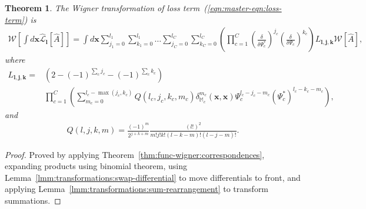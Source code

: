 \documentclass[12pt,aip,jmp,amssymb,amsmath]{revtex4-1}
\newtheorem{theorem}{Theorem}
\begin{document}
\begin{theorem}
\label{thm:transformations:w-losses}
    The Wigner transformation of loss term~(\ref{eqn:master-eqn:loss-term}) is
    \begin{equation*}\begin{split}
        \mathcal{W} \left[ \int d\boldsymbol{x} \hat{\mathcal{L}}_{\boldsymbol{l}} [\hat{A}] \right]
        = \int d\boldsymbol{x}
            \sum_{j_1=0}^{l_1} \sum_{k_1=0}^{l_1} \ldots
            \sum_{j_C=0}^{l_C} \sum_{k_C=0}^{l_C}
                \left(
                    \prod_{c=1}^C
                        \left( \frac{\delta}{\delta \Psi_c^*} \right)^{j_c}
                        \left( \frac{\delta}{\delta \Psi_c} \right)^{k_c}
                \right)
                L_{\boldsymbol{l}, \boldsymbol{j}, \boldsymbol{k}}
            \mathcal{W}[\hat{A}],
    \end{split}\end{equation*}
    where
    \begin{equation*}\begin{split}
        L_{\boldsymbol{l}, \boldsymbol{j}, \boldsymbol{k}}
        ={} & \left( 2 - (-1)^{\sum_c j_c} - (-1)^{\sum_c k_c} \right) \\
        &   \prod_{c=1}^C \left(
                \sum_{m_c=0}^{l_c - \max(j_c, k_c)}
                Q(l_c, j_c, k_c, m_c)
                \delta_{\mathbb{M}_c}^{m_c}(\boldsymbol{x}, \boldsymbol{x})
                \Psi_c^{l_c - j_c - m_c}
                (\Psi_c^*)^{l_c - k_c - m_c}
            \right),
    \end{split}\end{equation*}
    and
    \begin{equation*}\begin{split}
        Q(l, j, k, m)
        = \frac{(-1)^m}{2^{j + k + m}}
            \frac{(l!)^2}{m! j! k! (l - k - m)! (l - j - m)!}.
    \end{split}\end{equation*}
\end{theorem}
\begin{proof}
Proved by applying Theorem~\ref{thm:func-wigner:correspondences}, expanding products using binomial theorem, using Lemma~\ref{lmm:transformations:swap-differential} to move differentials to front, and applying Lemma~\ref{lmm:transformations:sum-rearrangement} to transform summations.
\end{proof}



\end{document}
